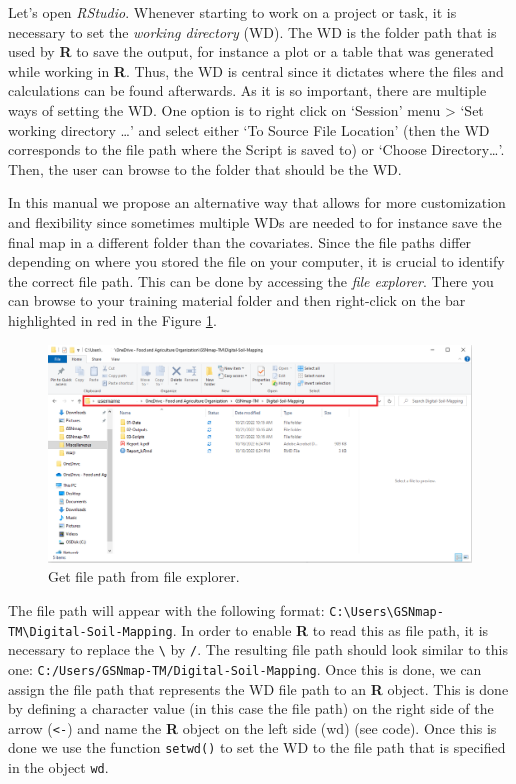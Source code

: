 \documentclass[
  10pt,
  b5paper,
  oneside]{book}
\begin{document}
Let's open \emph{RStudio}. Whenever starting to work on a project or task, it is necessary to set the \emph{working directory} (WD). The WD is the folder path that is used by \textbf{R} to save the output, for instance a plot or a table that was generated while working in \textbf{R}. Thus, the WD is central since it dictates where the files and calculations can be found afterwards. As it is so important, there are multiple ways of setting the WD.
One option is to right click on `Session' menu \textgreater{} `Set working directory \ldots{}' and select either `To Source File Location' (then the WD corresponds to the file path where the Script is saved to) or `Choose Directory\ldots{}'. Then, the user can browse to the folder that should be the WD.

In this manual we propose an alternative way that allows for more customization and flexibility since sometimes multiple WDs are needed to for instance save the final map in a different folder than the covariates. Since the file paths differ depending on where you stored the file on your computer, it is crucial to identify the correct file path. This can be done by accessing the \emph{file explorer}. There you can browse to your training material folder and then right-click on the bar highlighted in red in the Figure \ref{fig:explorer}.

\begin{figure}
\includegraphics[width=1\linewidth]{images/file-explorer} \caption{Get file path from file explorer.}\label{fig:explorer}
\end{figure}

The file path will appear with the following format: \texttt{C:\textbackslash{}Users\textbackslash{}GSNmap-TM\textbackslash{}Digital-Soil-Mapping}. In order to enable \textbf{R} to read this as file path, it is necessary to replace the \texttt{\textbackslash{}} by \texttt{/}. The resulting file path should look similar to this one: \texttt{C:/Users/GSNmap-TM/Digital-Soil-Mapping}. Once this is done, we can assign the file path that represents the WD file path to an \textbf{R} object. This is done by defining a character value (in this case the file path) on the right side of the arrow (\texttt{\textless{}-}) and name the \textbf{R} object on the left side (wd) (see code). Once this is done we use the function \texttt{setwd()} to set the WD to the file path that is specified in the object \texttt{wd}.
\end{document}
